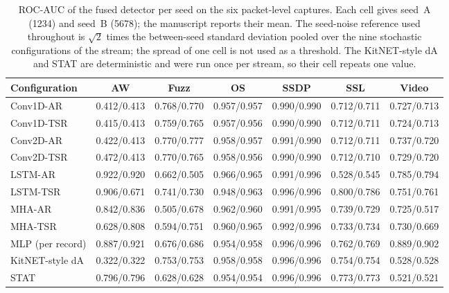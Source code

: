 \begin{table}[ht]\centering\scriptsize\setlength{\tabcolsep}{3pt}
\begin{tabular}{lcccccc}
\hline
\textbf{Configuration} & \textbf{AW} & \textbf{Fuzz} & \textbf{OS} & \textbf{SSDP} & \textbf{SSL} & \textbf{Video}\\
\hline
Conv1D-AR & 0.412/0.413 & 0.768/0.770 & 0.957/0.957 & 0.990/0.990 & 0.712/0.711 & 0.727/0.713\\
Conv1D-TSR & 0.415/0.413 & 0.759/0.765 & 0.957/0.956 & 0.990/0.990 & 0.712/0.711 & 0.724/0.713\\
Conv2D-AR & 0.422/0.413 & 0.770/0.777 & 0.958/0.957 & 0.991/0.990 & 0.712/0.711 & 0.737/0.720\\
Conv2D-TSR & 0.472/0.413 & 0.770/0.765 & 0.958/0.956 & 0.990/0.990 & 0.712/0.710 & 0.729/0.720\\
LSTM-AR & 0.922/0.920 & 0.662/0.505 & 0.966/0.965 & 0.991/0.996 & 0.528/0.545 & 0.785/0.794\\
LSTM-TSR & 0.906/0.671 & 0.741/0.730 & 0.948/0.963 & 0.996/0.996 & 0.800/0.786 & 0.751/0.761\\
MHA-AR & 0.842/0.836 & 0.505/0.678 & 0.962/0.960 & 0.991/0.995 & 0.739/0.729 & 0.725/0.517\\
MHA-TSR & 0.628/0.808 & 0.594/0.751 & 0.960/0.965 & 0.992/0.996 & 0.733/0.734 & 0.730/0.669\\
MLP (per record) & 0.887/0.921 & 0.676/0.686 & 0.954/0.958 & 0.996/0.996 & 0.762/0.769 & 0.889/0.902\\
KitNET-style dA & 0.322/0.322 & 0.753/0.753 & 0.958/0.958 & 0.996/0.996 & 0.754/0.754 & 0.528/0.528\\
STAT & 0.796/0.796 & 0.628/0.628 & 0.954/0.954 & 0.996/0.996 & 0.773/0.773 & 0.521/0.521\\
\hline
\end{tabular}
\caption{ROC-AUC of the fused detector per seed on the six packet-level captures. Each cell gives seed~A (1234) and seed~B (5678); the manuscript reports their mean. The seed-noise reference used throughout is $\sqrt{2}$ times the between-seed standard deviation pooled over the nine stochastic configurations of the stream; the spread of one cell is not used as a threshold. The KitNET-style dA and STAT are deterministic and were run once per stream, so their cell repeats one value.}\label{tab:s_seeds_a}
\end{table}

